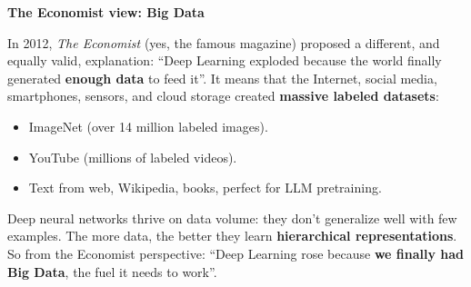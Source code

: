 \highspace
\begin{flushleft}
    \textcolor{Green3}{ \textbf{The Economist view: Big Data}}\label{economist-view}
\end{flushleft}
In 2012, \emph{The Economist} (yes, the famous magazine) proposed a different, and equally valid, explanation: ``Deep Learning exploded because the world finally generated \textbf{enough data} to feed it''. It means that the Internet, social media, smartphones, sensors, and cloud storage created \textbf{massive labeled datasets}:
\begin{itemize}
    \item ImageNet (over 14 million labeled images).
    \item YouTube (millions of labeled videos).
    \item Text from web, Wikipedia, books, perfect for LLM pretraining.
\end{itemize}
Deep neural networks thrive on data volume: they don't generalize well with few examples. The more data, the better they learn \textbf{hierarchical representations}. So from the Economist perspective: ``Deep Learning rose because \textbf{we finally had Big Data}, the fuel it needs to work''.

